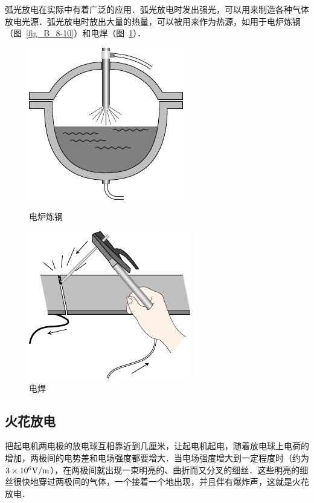弧光放电在实际中有着广泛的应用．弧光放电时发出强光，可以用来制造各种气体放电光源．弧光放电时放出大量的热量，可以被用来作为热源，如用于电炉炼钢（图~\ref{fig_B_8-10}）和电焊（图~\ref{fig_B_8-11}）．
\begin{figure}[htbp]
    \centering
    \begin{minipage}[t]{0.48\textwidth}
        \centering
        \includegraphics{fig/B/8-10.pdf}
        \caption{电炉炼钢}\label{fig_B_8-10}
    \end{minipage}
    \begin{minipage}[t]{0.48\textwidth}
        \centering
        \includegraphics{fig/B/8-11.pdf}
        \caption{电焊}\label{fig_B_8-11}
    \end{minipage}
\end{figure}

\subsection{火花放电}


把起电机两电极的放电球互相靠近到几厘米，让起电机起电，随着放电球上电荷的增加，两极间的电势差和电场强度都要增大．当电场强度增大到一定程度时（约为$3\times10^6{\rm V}/{\rm m}$），在两极间就出现一束明亮的、曲折而又分叉的细丝．这些明亮的细丝很快地穿过两极间的气体，一个接着一个地出现，并且伴有爆炸声，这就是火花放电．

